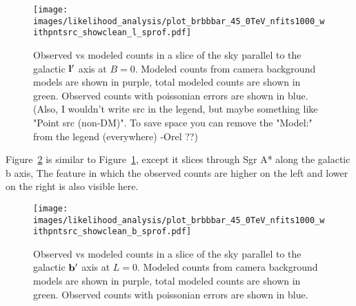   \begin{figure}[h]
    \centering
    \texttt{[image: images/likelihood\_analysis/plot\_brbbbar\_45\_0TeV\_nfits1000\_withpntsrc\_showclean\_l\_sprof.pdf]}
    \caption[Galactic Center Profile vs Galactic l]{
      Observed vs modeled counts in a slice of the sky parallel to the galactic $\mathbf{l'}$ axis at $B=0$.
      Modeled counts from camera background models are shown in purple, total modeled counts are shown in green.
      Observed counts with poissonian errors are shown in blue.
      {\color{red}(Also, I wouldn't write src in the legend, but maybe something like "Point src (non-DM)". To save space you can remove the "Model:" from the legend (everywhere) -Orel ??)}
    }
    \label{fig:gc_profile_gal_l}
  \end{figure}

  Figure~\ref{fig:gc_profile_gal_b} is similar to Figure~\ref{fig:gc_profile_gal_l}, except it slices through Sgr A* along the galactic b axis,
  The feature in which the observed counts are higher on the left and lower on the right is also visible here.

  \begin{figure}[h]
    \centering
    \texttt{[image: images/likelihood\_analysis/plot\_brbbbar\_45\_0TeV\_nfits1000\_withpntsrc\_showclean\_b\_sprof.pdf]}
    \caption[Galactic Center Profile vs Galactic b]{
      Observed vs modeled counts in a slice of the sky parallel to the galactic $\mathbf{b'}$ axis at $L=0$.
      Modeled counts from camera background models are shown in purple, total modeled counts are shown in green.
      Observed counts with poissonian errors are shown in blue.
    }
    \label{fig:gc_profile_gal_b}
  \end{figure}

